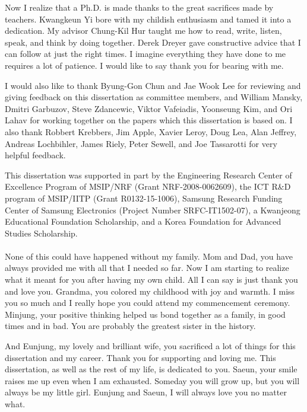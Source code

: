 \acknowledgement

Now I realize that a Ph.D. is made thanks to the great sacrifices made by teachers.  Kwangkeun Yi
bore with my childish enthusiasm and tamed it into a dedication.  My advisor Chung-Kil Hur taught me
how to read, write, listen, speak, and think by doing together.  Derek Dreyer gave constructive
advice that I can follow at just the right times.  I imagine everything they have done to me
requires a lot of patience.  I would like to say thank you for bearing with me.

I would also like to thank Byung-Gon Chun and Jae Wook Lee for reviewing and giving feedback on this
dissertation as committee members, and William Mansky, Dmitri Garbuzov, Steve Zdancewic, Viktor
Vafeiadis, Yoonseung Kim, and Ori Lahav for working together on the papers which this dissertation
is based on.  I also thank Robbert Krebbers, Jim Apple, Xavier Leroy, Doug Lea, Alan Jeffrey,
Andreas Lochbihler, James Riely, Peter Sewell, and Joe Tassarotti for very helpful feedback.

This dissertation was supported in part by the Engineering Research Center of Excellence Program of
MSIP/NRF (Grant NRF-2008-0062609), the ICT R\&D program of MSIP/IITP (Grant R0132-15-1006), Samsung
Research Funding Center of Samsung Electronics (Project Number SRFC-IT1502-07), a Kwanjeong
Educational Foundation Scholarship, and a Korea Foundation for Advanced Studies Scholarship.


\paragraph*{}

None of this could have happened without my family.  Mom and Dad, you have always provided me with
all that I needed so far.  Now I am starting to realize what it meant for you after having my own
child.  All I can say is just thank you and love you.  Grandma, you colored my childhood with joy
and warmth.  I miss you so much and I really hope you could attend my commencement ceremony.
Minjung, your positive thinking helped us bond together as a family, in good times and in bad.  You
are probably the greatest sister in the history.

And Eunjung, my lovely and brilliant wife, you sacrificed a lot of things for this dissertation and
my career.  Thank you for supporting and loving me.  This dissertation, as well as the rest of my
life, is dedicated to you.  Saeun, your smile raises me up even when I am exhausted.  Someday you
will grow up, but you will always be my little girl.  Eunjung and Saeun, I will always love you no
matter what.



